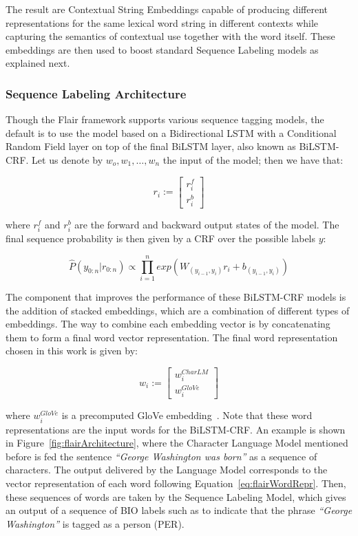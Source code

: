 The result are Contextual String Embeddings capable of producing different representations for 
the same lexical word string in different contexts while capturing the semantics of contextual 
use together with the word itself. These embeddings are then used to boost standard Sequence 
Labeling models as explained next.

\subsubsection{Sequence Labeling Architecture}
\label{cap3:infExtr/sequenceLabeling/architecture}
Though the Flair framework supports various sequence tagging models, the default is to use the 
model based on a Bidirectional LSTM with a Conditional Random Field layer on top of the final 
BiLSTM layer, also known as BiLSTM-CRF\cite{seqlab:HuangXY15}. Let us denote by $w_o,w_1,\ldots,w_n$ 
the input of the model; then we have that:

\[
    r_i := \begin{bmatrix} r_i^f \\ r_i^b \end{bmatrix}
\]

where $r_i^f$ and $r_i^b$ are the forward and backward output states of the model. The final 
sequence probability is then given by a CRF over the possible labels $y$:

\[
    \widehat{P}(y_{0:n}|r_{0:n})\propto \prod_{i=1}^n exp(W_{(y_{i-1},y_i)} r_i +b_{(y_{i-1},y_i)})
\]

The component that improves the performance of these BiLSTM-CRF models is the addition of 
stacked embeddings, which are a combination of different types of embeddings. The way to combine 
each embedding vector is by concatenating them to form a final word vector representation. The 
final word representation chosen in this work is given by:

\begin{equation} \label{eq:flairWordRepr}
    w_i := \begin{bmatrix} w_i^{CharLM} \\ w_i^{GloVe} \end{bmatrix}
\end{equation}

where $w_i^{GloVe}$ is a precomputed GloVe embedding~\cite{seqlab:PenningtonSM14}. Note that 
these word representations are the input words for the BiLSTM-CRF. An example is shown in 
Figure~\ref{fig:flairArchitecture}, where the Character Language Model mentioned before is fed 
the sentence \textit{“George Washington was born”} as a sequence of characters. The output 
delivered by the Language Model corresponds to the vector representation of each word following 
Equation~\ref{eq:flairWordRepr}. Then, these sequences of words are taken by the Sequence 
Labeling Model, which gives an output of a sequence of BIO labels such as to indicate that 
the phrase \textit{“George Washington”} is tagged as a person (PER).

